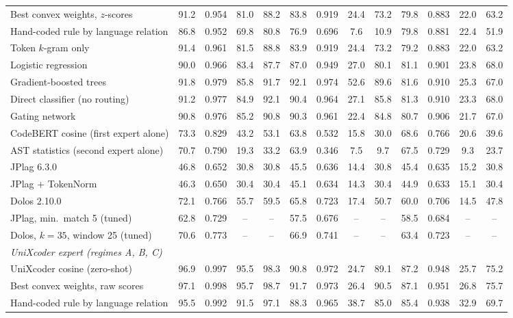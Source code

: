\begin{table}[t]
\begin{tabular}{l|cccc|cccc|cccc}
Best convex weights, $z$-scores & 91.2 & 0.954 & 81.0 & 88.2 & 83.8 & 0.919 & 24.4 & 73.2 & 79.8 & 0.883 & 22.0 & 63.2 \\
Hand-coded rule by language relation & 86.8 & 0.952 & 69.8 & 80.8 & 76.9 & 0.696 & 7.6 & 10.9 & 79.8 & 0.881 & 22.4 & 51.9 \\
Token $k$-gram only & 91.4 & 0.961 & 81.5 & 88.8 & 83.9 & 0.919 & 24.4 & 73.2 & 79.2 & 0.883 & 22.0 & 63.2 \\
Logistic regression & 90.0 & 0.966 & 83.4 & 87.7 & 87.0 & 0.949 & 27.0 & 80.1 & 81.1 & 0.901 & 23.8 & 68.0 \\
Gradient-boosted trees & 91.8 & 0.979 & 85.8 & 91.7 & 92.1 & 0.974 & 52.6 & 89.6 & 81.6 & 0.910 & 25.3 & 67.0 \\
Direct classifier (no routing) & 91.2 & 0.977 & 84.9 & 92.1 & 90.4 & 0.964 & 27.1 & 85.8 & 81.3 & 0.910 & 23.3 & 68.0 \\
Gating network & 90.8 & 0.976 & 85.2 & 90.8 & 90.3 & 0.961 & 22.4 & 84.8 & 80.7 & 0.906 & 21.7 & 67.0 \\
\midrule
CodeBERT cosine (first expert alone) & 73.3 & 0.829 & 43.2 & 53.1 & 63.8 & 0.532 & 15.8 & 30.0 & 68.6 & 0.766 & 20.6 & 39.6 \\
AST statistics (second expert alone) & 70.7 & 0.790 & 19.3 & 33.2 & 63.9 & 0.346 & 7.5 & 9.7 & 67.5 & 0.729 & 9.3 & 23.7 \\
JPlag 6.3.0 & 46.8 & 0.652 & 30.8 & 30.8 & 45.5 & 0.636 & 14.4 & 30.8 & 45.4 & 0.635 & 15.2 & 30.8 \\
JPlag + TokenNorm & 46.3 & 0.650 & 30.4 & 30.4 & 45.1 & 0.634 & 14.3 & 30.4 & 44.9 & 0.633 & 15.1 & 30.4 \\
Dolos 2.10.0 & 72.1 & 0.766 & 55.7 & 59.5 & 65.8 & 0.723 & 17.4 & 50.7 & 60.0 & 0.706 & 14.5 & 47.8 \\
JPlag, min.\ match 5 (tuned) & 62.8 & 0.729 & -- & -- & 57.5 & 0.676 & -- & -- & 58.5 & 0.684 & -- & -- \\
Dolos, $k=35$, window 25 (tuned) & 70.6 & 0.773 & -- & -- & 66.9 & 0.741 & -- & -- & 63.4 & 0.723 & -- & -- \\
\midrule
\multicolumn{13}{l}{\emph{UniXcoder expert (regimes A, B, C)}} \\
UniXcoder cosine (zero-shot) & 96.9 & 0.997 & 95.5 & 98.3 & 90.8 & 0.972 & 24.7 & 89.1 & 87.2 & 0.948 & 25.7 & 75.2 \\
Best convex weights, raw scores & 97.1 & 0.998 & 95.7 & 98.7 & 91.7 & 0.973 & 26.4 & 90.5 & 87.1 & 0.951 & 26.8 & 75.7 \\
Hand-coded rule by language relation & 95.5 & 0.992 & 91.5 & 97.1 & 88.3 & 0.965 & 38.7 & 85.0 & 85.4 & 0.938 & 32.9 & 69.7 \\

\end{tabular}
\end{table}
